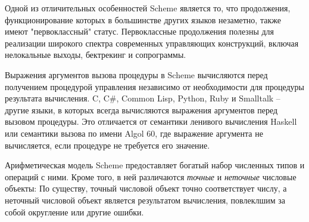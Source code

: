 \vest Одной из отличительных особенностей Scheme является то, что продолжения, функционирование
которых в большинстве других языков незаметно, также имеют "первоклассный" статус. Первоклассные
продолжения полезны для реализации широкого спектра современных управляющих конструкций, включая
нелокальные выходы, бектрекинг и сопрограммы.


Выражения аргументов вызова процедуры в Scheme вычисляются перед получением процедурой
управления независимо от необходимости для процедуры результата вычисления.
C, C\#, Common Lisp, Python, Ruby и Smalltalk -- другие языки, в которых всегда вычисляются выражения
аргументов перед вызовом процедуры. Это отличается от семантики ленивого вычисления Haskell или
семантики вызова по имени Algol 60, где выражение аргумента не вычисляется, если процедуре не
требуется его значение.\vspace{1mm}

Арифметическая модель Scheme предоставляет богатый набор численных типов и операций с
ними. Кроме того, в ней различаются \textit{точные} и \textit{неточные} числовые объекты: По
существу, точный числовой объект точно соответствует числу, а неточный числовой объект является
результатом вычисления, повлеклшим за собой округление или другие ошибки.\vspace{1mm}

